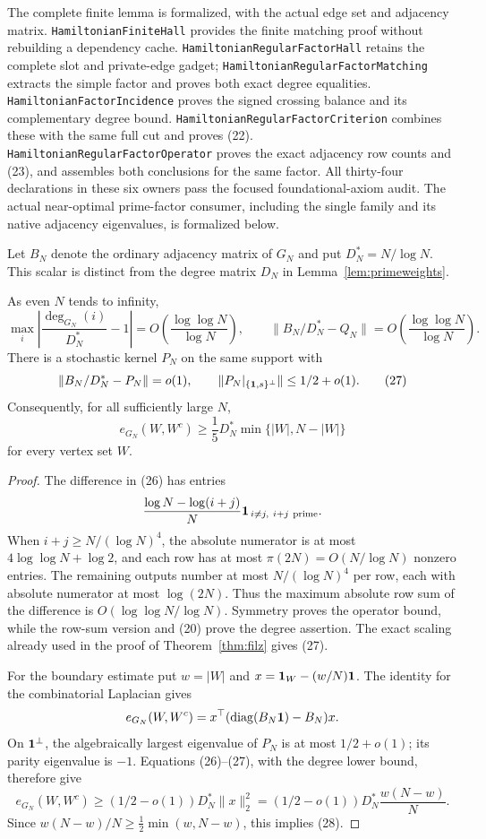 The complete finite lemma is formalized, with the actual edge set
and adjacency matrix. \texttt{HamiltonianFiniteHall} provides
the finite matching proof without rebuilding a dependency cache.
\texttt{HamiltonianRegularFactorHall} retains the complete slot
and private-edge gadget; \texttt{HamiltonianRegularFactorMatching}
extracts the simple factor and proves both exact degree equalities.
\texttt{HamiltonianFactorIncidence} proves the signed crossing
balance and its complementary degree bound.
\texttt{HamiltonianRegularFactorCriterion} combines these with
the same full cut and proves (22).
\texttt{HamiltonianRegularFactorOperator} proves the exact
adjacency row counts and (23), and assembles both conclusions
for the same factor. All thirty-four declarations in these six
owners pass the focused foundational-axiom audit. The actual
near-optimal prime-factor consumer, including the single family
and its native adjacency eigenvalues, is formalized below.

Let \(B_N\) denote the ordinary adjacency matrix of \(G_N\)
and put \(D_N^*=N/\log N\).
This scalar is distinct from the degree matrix \(D_N\)
in Lemma~\ref{lem:primeweights}.

\begin{lemma}
\label{lem:unweightedtransfer}
As even \(N\) tends to infinity,
\[
 \max_i\left|\frac{\deg_{G_N}(i)}{D_N^*}-1\right|
       =O\left(\frac{\log\log N}{\log N}\right),\qquad
 \|B_N/D_N^*-Q_N\|
       =O\left(\frac{\log\log N}{\log N}\right).              \tag{26}
\]
There is a stochastic kernel \(P_N\) on the same support with
\[
 \|B_N/D_N^*-P_N\|=o(1),\qquad
 \|P_N|_{\{\mathbf1,s\}^{\perp}}\|\leq1/2+o(1).
 \tag{27}
\]
Consequently, for all sufficiently large \(N\),
\[
 e_{G_N}(W,W^c)\geq\frac15D_N^*
                  \min\{|W|,N-|W|\}                        \tag{28}
\]
for every vertex set \(W\).
\end{lemma}
\begin{proof}
The difference in (26) has entries
\[
 \frac{\log N-\log(i+j)}N
                    \mathbf1_{\,i\ne j,\ i+j\ {\rm prime}}.
\]
When \(i+j\geq N/(\log N)^4\), the absolute numerator is at
most \(4\log\log N+\log2\), and each row has at most
\(\pi(2N)=O(N/\log N)\) nonzero entries.
The remaining outputs number at most \(N/(\log N)^4\)
per row, each with absolute numerator at most \(\log(2N)\).
Thus the maximum absolute row sum of the difference is
\(O(\log\log N/\log N)\).
Symmetry proves the operator bound, while the row-sum version
and (20) prove the degree assertion.
The exact scaling already used in the proof of
Theorem~\ref{thm:filz} gives (27).

For the boundary estimate put \(w=|W|\) and
\(x=\mathbf1_W-(w/N)\mathbf1\).
The identity for the combinatorial Laplacian gives
\[
 e_{G_N}(W,W^c)
 =x^\top(\operatorname{diag}(B_N\mathbf1)-B_N)x.
\]
On \(\mathbf1^\perp\), the algebraically largest eigenvalue of
\(P_N\) is at most \(1/2+o(1)\); its parity eigenvalue is \(-1\).
Equations (26)--(27), with the degree lower bound, therefore give
\[
 e_{G_N}(W,W^c)
 \geq(1/2-o(1))D_N^*\|x\|_2^2
 =(1/2-o(1))D_N^*\frac{w(N-w)}N.
\]
Since \(w(N-w)/N\geq\frac12\min(w,N-w)\), this implies (28).
\end{proof}

